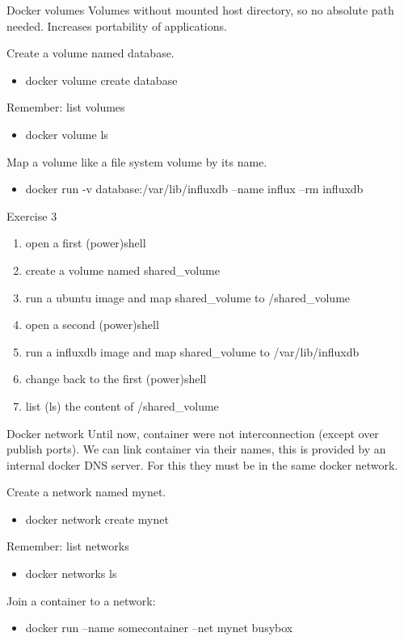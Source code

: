\documentclass[10pt,aspectratio=\ratio,
compress
]{beamer}
\begin{document}
\begin{frame}{Docker volumes}
Volumes without mounted host directory, so no absolute path needed. Increases portability of applications.


Create a volume named database.
\begin{itemize}
	\item docker volume create database
\end{itemize}
Remember: list volumes
\begin{itemize}
	\item docker volume ls
\end{itemize}

Map a volume like a file system volume by its name.
\begin{itemize}
	\item docker run -v database:/var/lib/influxdb --name influx --rm influxdb
\end{itemize}
\end{frame}

\begin{frame}{Exercise 3}
\begin{enumerate}
	\item open a first (power)shell
	\item create a volume named shared\_volume
	\item run a ubuntu image and map shared\_volume to /shared\_volume
	\item open a second (power)shell
	\item run a influxdb image and map shared\_volume to /var/lib/influxdb
	\item change back to the first (power)shell
	\item list (ls) the content of /shared\_volume
	
\end{enumerate}
\end{frame}


\begin{frame}{Docker network}
Until now, container were not interconnection (except over publish ports).
We can link container via their names, this is provided by an internal docker DNS server.
For this they must be in the same docker network.

Create a network named mynet.
\begin{itemize}
	\item docker network create mynet
\end{itemize}
Remember: list networks
\begin{itemize}
	\item docker networks ls
\end{itemize}

Join a container to a network:
\begin{itemize}
	\item docker run --name somecontainer --net mynet busybox
\end{itemize}

\end{frame}
\end{document}
